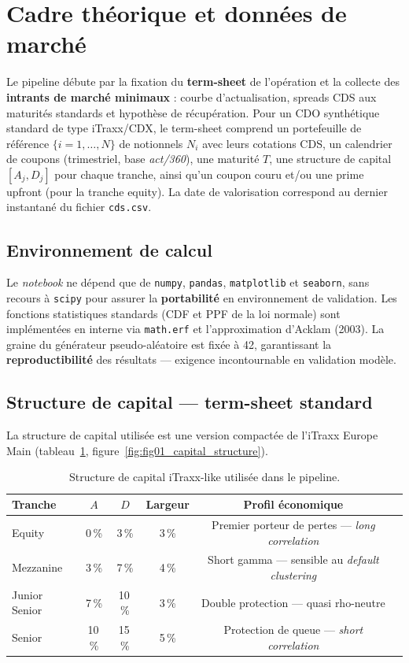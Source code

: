 \documentclass[11pt,a4paper]{article}
\begin{document}
\section{Cadre théorique et données de marché}\label{sec:framework}

Le pipeline débute par la fixation du \textbf{term-sheet} de l'opération et la
collecte des \textbf{intrants de marché minimaux} : courbe d'actualisation, spreads
CDS aux maturités standards et hypothèse de récupération. Pour un CDO synthétique
standard de type iTraxx/CDX, le term-sheet comprend un portefeuille de référence
$\{i = 1, \dots, N\}$ de notionnels $N_i$ avec leurs cotations CDS, un calendrier de
coupons (trimestriel, base \emph{act/360}), une maturité $T$, une structure de capital
$[A_j, D_j]$ pour chaque tranche, ainsi qu'un coupon couru et/ou une prime upfront
(pour la tranche equity). La date de valorisation correspond au dernier instantané
du fichier \texttt{cds.csv}.

\subsection{Environnement de calcul}
Le \emph{notebook} ne dépend que de \texttt{numpy}, \texttt{pandas},
\texttt{matplotlib} et \texttt{seaborn}, sans recours à \texttt{scipy} pour assurer
la \textbf{portabilité} en environnement de validation. Les fonctions statistiques
standards (CDF et PPF de la loi normale) sont implémentées en interne via
\texttt{math.erf} et l'approximation d'Acklam (2003). La graine du générateur
pseudo-aléatoire est fixée à 42, garantissant la \textbf{reproductibilité} des
résultats --- exigence incontournable en validation modèle.

\subsection{Structure de capital --- term-sheet standard}
La structure de capital utilisée est une version compactée de l'iTraxx Europe Main
(tableau~\ref{tab:tranches}, figure~\ref{fig:fig01_capital_structure}).

\begin{table}[H]
\centering
\begin{tabular}{lccccp{6cm}}
\toprule
\textbf{Tranche} & $A$ & $D$ & \textbf{Largeur} & \textbf{Profil économique} \\
\midrule
Equity        & 0\,\%  & 3\,\%  & 3\,\% & Premier porteur de pertes --- \emph{long correlation} \\
Mezzanine     & 3\,\%  & 7\,\%  & 4\,\% & Short gamma --- sensible au \emph{default clustering} \\
Junior Senior & 7\,\%  & 10\,\% & 3\,\% & Double protection --- quasi rho-neutre \\
Senior        & 10\,\% & 15\,\% & 5\,\% & Protection de queue --- \emph{short correlation} \\
\bottomrule
\end{tabular}
\caption{Structure de capital iTraxx-like utilisée dans le pipeline.}
\label{tab:tranches}
\end{table}
\end{document}
